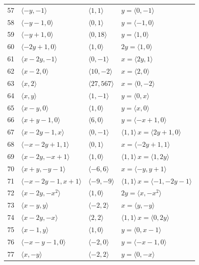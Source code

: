 \documentclass[11pt]{article}
\begin{document}
\begin{longtable}{@{}rlll@{}}
57 & $\langle -y,-1\rangle$ & $\langle 1,1\rangle$ & $y=\langle 0,-1\rangle$\\
58 & $\langle -y-1,0\rangle$ & $\langle 0,1\rangle$ & $y=\langle -1,0\rangle$\\
59 & $\langle -y+1,0\rangle$ & $\langle 0,18\rangle$ & $y=\langle 1,0\rangle$\\
60 & $\langle -2y+1,0\rangle$ & $\langle 1,0\rangle$ & $2y=\langle 1,0\rangle$\\
61 & $\langle x-2y,-1\rangle$ & $\langle 0,-1\rangle$ & $x=\langle 2y,1\rangle$\\
62 & $\langle x-2,0\rangle$ & $\langle 10,-2\rangle$ & $x=\langle 2,0\rangle$\\
63 & $\langle x,2\rangle$ & $\langle 27,567\rangle$ & $x=\langle 0,-2\rangle$\\
64 & $\langle x,y\rangle$ & $\langle 1,-1\rangle$ & $y=\langle 0,x\rangle$\\
65 & $\langle x-y,0\rangle$ & $\langle 1,0\rangle$ & $y=\langle x,0\rangle$\\
66 & $\langle x+y-1,0\rangle$ & $\langle 6,0\rangle$ & $y=\langle -x+1,0\rangle$\\
67 & $\langle x-2y-1,x\rangle$ & $\langle 0,-1\rangle$ & $\langle 1,1\rangle\,x=\langle 2y+1,0\rangle$\\
68 & $\langle -x-2y+1,1\rangle$ & $\langle 0,1\rangle$ & $x=\langle -2y+1,1\rangle$\\
69 & $\langle x-2y,-x+1\rangle$ & $\langle 1,0\rangle$ & $\langle 1,1\rangle\,x=\langle 1,2y\rangle$\\
70 & $\langle x+y,-y-1\rangle$ & $\langle -6,6\rangle$ & $x=\langle -y,y+1\rangle$\\
71 & $\langle -x-2y-1,x+1\rangle$ & $\langle -9,-9\rangle$ & $\langle 1,1\rangle\,x=\langle -1,-2y-1\rangle$\\
72 & $\langle x-2y,-x^{2}\rangle$ & $\langle 1,0\rangle$ & $2y=\langle x,-x^{2}\rangle$\\
73 & $\langle x-y,y\rangle$ & $\langle -2,2\rangle$ & $x=\langle y,-y\rangle$\\
74 & $\langle x-2y,-x\rangle$ & $\langle 2,2\rangle$ & $\langle 1,1\rangle\,x=\langle 0,2y\rangle$\\
75 & $\langle x-1,y\rangle$ & $\langle 1,0\rangle$ & $y=\langle 0,x-1\rangle$\\
76 & $\langle -x-y-1,0\rangle$ & $\langle -2,0\rangle$ & $y=\langle -x-1,0\rangle$\\
77 & $\langle x,-y\rangle$ & $\langle -2,2\rangle$ & $y=\langle 0,-x\rangle$\\
\end{longtable}
\endgroup
\end{document}
